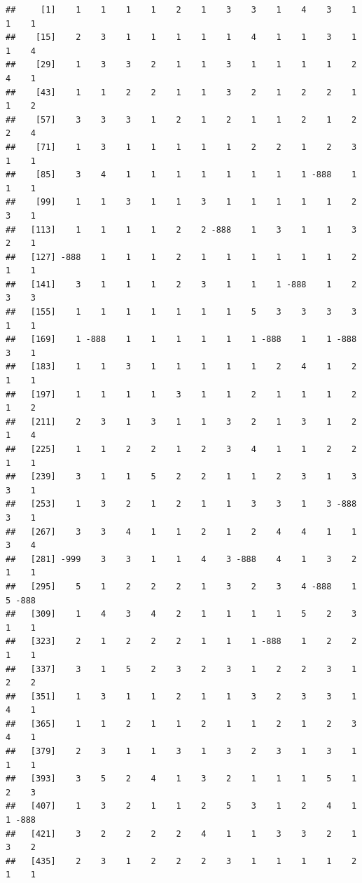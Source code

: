 \documentclass[
  12pt,
  openany]{book}
\begin{document}
\begin{verbatim}
##     [1]    1    1    1    1    2    1    3    3    1    4    3    1    1    1
##    [15]    2    3    1    1    1    1    1    4    1    1    3    1    1    4
##    [29]    1    3    3    2    1    1    3    1    1    1    1    2    4    1
##    [43]    1    1    2    2    1    1    3    2    1    2    2    1    1    2
##    [57]    3    3    3    1    2    1    2    1    1    2    1    2    2    4
##    [71]    1    3    1    1    1    1    1    2    2    1    2    3    1    1
##    [85]    3    4    1    1    1    1    1    1    1    1 -888    1    1    1
##    [99]    1    1    3    1    1    3    1    1    1    1    1    2    3    1
##   [113]    1    1    1    1    2    2 -888    1    3    1    1    3    2    1
##   [127] -888    1    1    1    2    1    1    1    1    1    1    2    1    1
##   [141]    3    1    1    1    2    3    1    1    1 -888    1    2    3    3
##   [155]    1    1    1    1    1    1    1    5    3    3    3    3    1    1
##   [169]    1 -888    1    1    1    1    1    1 -888    1    1 -888    3    1
##   [183]    1    1    3    1    1    1    1    1    2    4    1    2    1    1
##   [197]    1    1    1    1    3    1    1    2    1    1    1    2    1    2
##   [211]    2    3    1    3    1    1    3    2    1    3    1    2    1    4
##   [225]    1    1    2    2    1    2    3    4    1    1    2    2    1    1
##   [239]    3    1    1    5    2    2    1    1    2    3    1    3    3    1
##   [253]    1    3    2    1    2    1    1    3    3    1    3 -888    3    1
##   [267]    3    3    4    1    1    2    1    2    4    4    1    1    3    4
##   [281] -999    3    3    1    1    4    3 -888    4    1    3    2    1    1
##   [295]    5    1    2    2    2    1    3    2    3    4 -888    1    5 -888
##   [309]    1    4    3    4    2    1    1    1    1    5    2    3    1    1
##   [323]    2    1    2    2    2    1    1    1 -888    1    2    2    1    1
##   [337]    3    1    5    2    3    2    3    1    2    2    3    1    2    2
##   [351]    1    3    1    1    2    1    1    3    2    3    3    1    4    1
##   [365]    1    1    2    1    1    2    1    1    2    1    2    3    4    1
##   [379]    2    3    1    1    3    1    3    2    3    1    3    1    1    1
##   [393]    3    5    2    4    1    3    2    1    1    1    5    1    2    3
##   [407]    1    3    2    1    1    2    5    3    1    2    4    1    1 -888
##   [421]    3    2    2    2    2    4    1    1    3    3    2    1    3    2
##   [435]    2    3    1    2    2    2    3    1    1    1    1    2    1    1

\end{verbatim}
\end{document}
